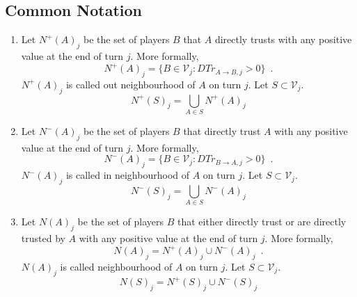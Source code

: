\documentclass[11pt]{llncs}
\theoremstyle{definition}
\begin{document}
    \subsection{Common Notation}
     \begin{definition}[Neighbourhood]
        \label{neighbourhood}
        \begin{enumerate}
           \item Let $N^{+}\left(A\right)_j$ be the set of players $B$ that $A$ directly trusts with any positive value at
              the end of turn $j$. More formally,
              \begin{equation}
                 N^{+}\left(A\right)_j = \{B \in \mathcal{V}_j : DTr_{A \rightarrow B, j} > 0\} \enspace.
              \end{equation}
              $N^{+}\left(A\right)_j$ is called out neighbourhood of $A$ on turn $j$. Let $S \subset \mathcal{V}_j$.
              \begin{equation}
                 N^{+}\left(S\right)_j = \bigcup\limits_{A \in S}N^{+}\left(A\right)_j
              \end{equation}
           \item Let $N^{-}\left(A\right)_j$ be the set of players $B$ that directly trust $A$ with any positive value at the
              end of turn $j$. More formally,
              \begin{equation}
                 N^{-}\left(A\right)_j = \{B \in \mathcal{V}_j : DTr_{B \rightarrow A, j} > 0\} \enspace.
              \end{equation}
              $N^{-}\left(A\right)_j$ is called in neighbourhood of $A$ on turn $j$. Let $S \subset \mathcal{V}_j$.
              \begin{equation}
                 N^{-}\left(S\right)_j = \bigcup\limits_{A \in S}N^{-}\left(A\right)_j
              \end{equation}
           \item Let $N\left(A\right)_j$ be the set of players $B$ that either directly trust or are directly trusted by $A$
              with any positive value at the end of turn $j$. More formally,
              \begin{equation}
                 N\left(A\right)_j = N^{+}\left(A\right)_j \cup N^{-}\left(A\right)_j \enspace.
              \end{equation}
              $N\left(A\right)_j$ is called neighbourhood of $A$ on turn $j$. Let $S \subset \mathcal{V}_j$.
              \begin{equation}
                 N\left(S\right)_j = N^{+}\left(S\right)_j \cup N^{-}\left(S\right)_j
              \end{equation}
        \end{enumerate}
     \end{definition}
\end{document}
